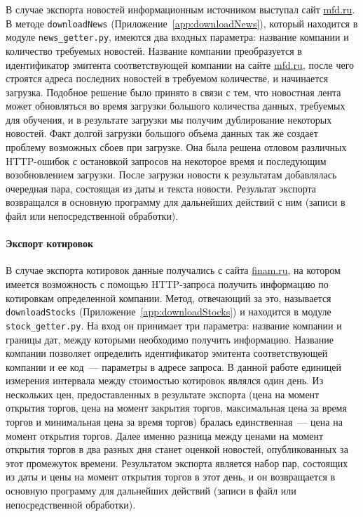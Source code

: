 \documentclass[14pt]{matmex-diploma-custom}
\begin{document}
В случае экспорта новостей информационным источником выступал сайт \url{mfd.ru}. В методе \texttt{downloadNews} (Приложение~\ref{app:downloadNews}), который находится в модуле \texttt{news\_getter.py}, имеются два входных параметра: название компании и количество требуемых новостей. Название компании преобразуется в идентификатор эмитента соответствующей компании на сайте \url{mfd.ru}, после чего строятся адреса последних новостей в требуемом количестве, и начинается загрузка. Подобное решение было принято в связи с тем, что новостная лента может обновляться во время загрузки большого количества данных, требуемых для обучения, и в результате загрузки мы получим дублирование некоторых новостей. Факт долгой загрузки большого объема данных так же создает проблему возможных сбоев при загрузке. Она была решена отловом различных HTTP-ошибок с остановкой запросов на некоторое время и последующим возобновлением загрузки. После загрузки новости к результатам добавлялась очередная пара, состоящая из даты и текста новости. Результат экспорта возвращался в основную программу для дальнейших действий с ним (записи в файл или непосредственной обработки).

\paragraph{Экспорт котировок}

В случае экспорта котировок данные получались с сайта \url{finam.ru}, на котором имеется возможность с помощью HTTP-запроса получить информацию по котировкам определенной компании. Метод, отвечающий за это, называется \texttt{downloadStocks} (Приложение~\ref{app:downloadStocks}) и находится в модуле \texttt{stock\_getter.py}. На вход он принимает три параметра: название компании и границы дат, между которыми необходимо получить информацию. Название компании позволяет определить идентификатор эмитента соответствующей компании и ее код~--- параметры в адресе запроса. В данной работе единицей измерения интервала между стоимостью котировок являлся один день. Из нескольких цен, предоставленных в результате экспорта (цена на момент открытия торгов, цена на момент закрытия торгов, максимальная цена за время торгов и минимальная цена за время торгов) бралась единственная~--- цена на момент открытия торгов. Далее именно разница между ценами на момент открытия торгов в два разных дня станет оценкой новостей, опубликованных за этот промежуток времени. Результатом экспорта является набор пар, состоящих из даты и цены на момент открытия торгов в этот день, и он возвращается в основную программу для дальнейших действий (записи в файл или непосредственной обработки).
\end{document}
